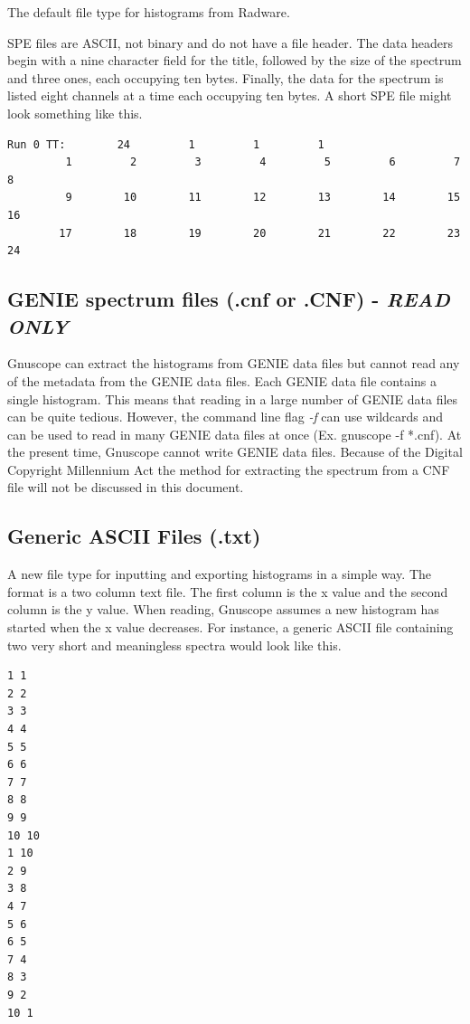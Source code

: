 The default file type for histograms from Radware.

SPE files are ASCII, not binary and do not have a file header.  The data headers begin with a nine character field for the title, followed by the size of the spectrum and three ones, each occupying ten bytes.  Finally, the data for the spectrum is listed eight channels at a time each occupying ten bytes.  A short SPE file might look something like this.

{\tiny
\begin{verbatim}
Run 0 TT:        24         1         1         1
         1         2         3         4         5         6         7         8
         9        10        11        12        13        14        15        16
        17        18        19        20        21        22        23        24
\end{verbatim}
}

 \subsection{GENIE spectrum files (.cnf or .CNF) - {\it READ ONLY}}

Gnuscope can extract the histograms from GENIE data files but cannot read any of the metadata from the GENIE data files.  Each GENIE data file contains a single histogram.  This means that reading in a large number of GENIE data files can be quite tedious.  However, the command line flag {\it -f} can use wildcards and can be used to read in many GENIE data files at once (Ex. gnuscope -f *.cnf).  At the present time, Gnuscope cannot write GENIE data files.  Because of the Digital Copyright Millennium Act the method for extracting the spectrum from a CNF file will not be discussed in this document.

 \subsection{Generic ASCII Files (.txt)}

A new file type for inputting and exporting histograms in a simple way.  The format is a two column text file.  The first column is the x value and the second column is the y value.  When reading, Gnuscope assumes a new histogram has started when the x value decreases.  For instance, a generic ASCII file containing two very short and meaningless spectra would look like this.

\begin{verbatim}
1 1
2 2
3 3
4 4
5 5
6 6
7 7
8 8
9 9
10 10
1 10
2 9
3 8
4 7
5 6
6 5
7 4
8 3
9 2
10 1
\end{verbatim}

